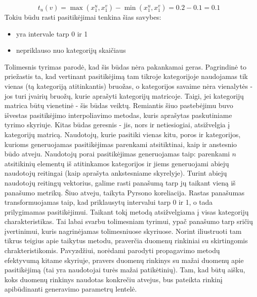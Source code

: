 \documentclass{VUMIFInfMagistrinis}
\begin{document}
\begin{equation}
t_u(v) = \max(x_1^u, x_1^v) - \min(x_1^u, x_1^v) = 0.2 -0.1 = 0.1
\end{equation}
Tokiu būdu rasti pasitikėjimai tenkina šias savybes:
\begin{itemize}
	\item yra intervale tarp 0 ir 1
	\item nepriklauso nuo kategorijų skaičiaus
\end{itemize}
\indent
Tolimesnis tyrimas parodė, kad šis būdas nėra pakankamai geras. Pagrindinė to priežastis ta, kad vertinant pasitikėjimą tam tikroje kategorijoje naudojamas tik vienas (tą kategoriją atitinkantis) bruožas, o kategorijos savaime nėra vienalytės - jos turi įvairių bruožų, kurie aprašyti kategorijų matricoje. Taigi, jei kategorijų matrica būtų vienetinė - šis būdas veiktų. Remiantis šiuo pastebėjimu buvo išvestas pasitikėjimo interpoliavimo metodas, kuris aprašytas paskutiniame tyrimo skyriuje. 
\newline
\indent
Kitas būdas geresnis - jis, nors ir netiesiogiai, atsižvelgia į kategorijų matricą. Naudotojų, kurie pasitiki vienas kitu, poros ir kategorijos, kurioms generuojamas pasitikėjimas parenkami atsitiktinai, kaip ir anstesnio būdo atveju. Naudotojų porai pasitikėjimas generuojamas taip: parenkami $n$ atsitikinių elementų iš atitinkamos kategorijos ir jiems generuojami abiejų naudotojų reitingai (kaip aprašyta ankstesniame skyrelyje). Turint abiejų naudotojų reitingų vektorius, galime rasti panašumą tarp jų taikant vieną iš panašumo metrikų. Šiuo atveju, taikyta Pyrsono koreliacija. Rastas panašumas transformuojamas taip, kad priklausytų intervalui tarp 0 ir 1, o tada prilygimamas pasitikėjimui. Taikant tokį metodą atsižvelgiama į visas kategorijų charakteristikas. Tai labai svarbu tolimesniam tyrimui, ypač panašumo tarp sričių įvertinimui, kuris nagrinėjamas tolimesniuose skyriuose.
\indent
Norint iliustruoti tam tikrus teigius apie taikytus metodu, praverčia duomenų rinkiniai su skirtingomis chrakteristikomis. Pavyzdžiui, norėdami parodyti propagavimo metodų efektyvumą kitame skyriuje, pravers duomenų rinkinys su mažai duomenų apie pasitikėjimą (tai yra naudotojai turės mažai patikėtinių). Tam, kad būtų aišku, koks duomenų rinkinys naudotas konkrečiu atvejus, bus pateikta rinkinį apibūdinanti generavimo parametrų lentelė. 
\end{document}
